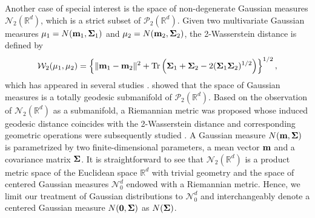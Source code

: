 \documentclass[11pt]{article}
\newcommand{\calN}{\mathcal{N}}
\newcommand{\calP}{\mathcal{P}}
\newcommand{\calW}{\mathcal{W}}
\newcommand{\Rd}{\mathbb{R}^d}
\newcommand{\SPD}{\mathcal{N}_{0}^{d}}
\begin{document}
Another case of special interest is the space of non-degenerate Gaussian measures $\calN_2(\Rd)$, which is a strict subset of $\calP_2(\Rd)$. Given two multivariate Gaussian measures $\mu_1 = N({\bf m}_1,{\bf \Sigma}_1)$ and $\mu_2 = N({\bf m}_2, {\bf \Sigma}_2)$, the 2-Wasserstein distance is defined by
\begin{equation*}
	\calW_2 (\mu_1, \mu_2) = \left\lbrace  \| {\bf m}_1 - {\bf m}_2 \|^2 + \text{Tr} \left( {\bf \Sigma}_1 + {\bf \Sigma}_2 - 2 ({\bf \Sigma}_1{\bf \Sigma}_2)^{1/2}\right)\right\rbrace^{1/2},
\end{equation*}
which has appeared  in several studies \citep{dowson_1982_FrechetDistanceMultivariate, olkin_1982_DistanceTwoRandom, givens_1984_ClassWassersteinMetrics, knott_1984_OptimalMappingDistributions}. \cite{mccann_1997_ConvexityPrincipleInteracting} showed that the space of Gaussian measures is a totally geodesic submanifold of $\calP_2(\Rd)$. Based on the observation of $\calN_2(\Rd)$ as a submanifold, a Riemannian metric was proposed whose induced geodesic distance coincides with the 2-Wasserstein distance  \citep{takatsu_2011_WassersteinGeometryGaussian} and corresponding geometric operations were subsequently studied \citep{malago_2018_WassersteinRiemannianGeometry}. A Gaussian measure $N({\bf m}, {\bf \Sigma})$ is parametrized by two finite-dimensional parameters,  a mean vector ${\bf m}$ and a  covariance matrix ${\bf \Sigma}$. It is straightforward to see that  $\calN_2(\Rd)$ is a product metric space of the Euclidean space $\Rd$ with trivial geometry and the space of centered Gaussian measures $\calN_0^d$ endowed with a Riemannian metric. Hence, we limit our treatment of Gaussian distributions to $\SPD$ and interchangeably denote a centered Gaussian measure $N({\bf 0},{\bf \Sigma})$ as $N({\bf \Sigma})$.
\end{document}
